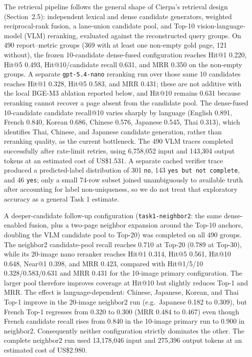 \documentclass[sigconf,article]{acmart}
\begin{document}
The retrieval pipeline follows the general shape of Cierpa's retrieval design (Section~2.5): independent lexical and dense candidate generators, weighted reciprocal-rank fusion, a lane-union candidate pool, and Top-10 vision-language-model (VLM) reranking, evaluated against the reconstructed query groups. On 490 report--metric groups (369 with at least one non-empty gold page, 121 without), the frozen 10-candidate dense-fused configuration reaches Hit@1 0.220, Hit@5 0.493, Hit@10/candidate recall 0.631, and MRR 0.350 on the non-empty groups. A separate \texttt{gpt-5.4-nano} reranking run over those same 10 candidates reaches Hit@1 0.328, Hit@5 0.583, and MRR 0.431; these are not additive with the local BGE-M3 ablation reported below, and Hit@10 remains 0.631 because reranking cannot recover a page absent from the candidate pool. The dense-fused 10-candidate candidate recall@10 varies sharply by language (English 0.891, French 0.840, Korean 0.686, Chinese 0.576, Japanese 0.545, Thai 0.313), which identifies Thai, Chinese, and Japanese candidate generation, rather than reranking quality, as the current bottleneck. The 490 VLM traces completed successfully after rate-limit retries, using 6,758,052 input and 143,304 output tokens at an estimated cost of US\$1.531. A separate cached verifier trace produced a predicted-label distribution of 301 \texttt{no}, 143 \texttt{yes but not complete}, and 46 \texttt{yes}; only a small 74-row subset joined unambiguously to available truth after accounting for label non-uniqueness, so we do not treat that exploratory accuracy as a general Task 1 estimate.

A deeper-candidate follow-up configuration (\texttt{task1-neighbor2}: the same dense-enabled fusion, plus a two-page neighbor expansion around the Top-10 anchors, doubling the VLM candidate pool to Top-20) was completed on all 490 groups. The neighbor2 candidate-pool recall reaches 0.710 at Top-20 (0.789 at Top-30), while its 20-image nano reranker reaches Hit@1 0.314, Hit@5 0.561, Hit@10 0.648, Near@1 0.398, and MRR 0.423, compared with Hit@1/5/10 0.328/0.583/0.631 and MRR 0.431 for the 10-image primary configuration. The larger pool therefore improves coverage at Hit@10 but slightly reduces Top-1 and MRR. The effect is language-dependent: Chinese, Japanese, Korean, and Thai Top-1 improve in the 20-image neighbor2 run (e.g.\ Japanese 0.182 to 0.309), but French Top-1 regresses from 0.320 to 0.300 (MRR 0.484 to 0.467) even though French candidate recall rises from 0.840 in the 10-image primary run to 0.900 in neighbor2. Consequently neither configuration strictly dominates the other. The complete neighbor2 run used 13,178,046 input and 275,396 output tokens at an estimated cost of US\$2.980.
\end{document}
